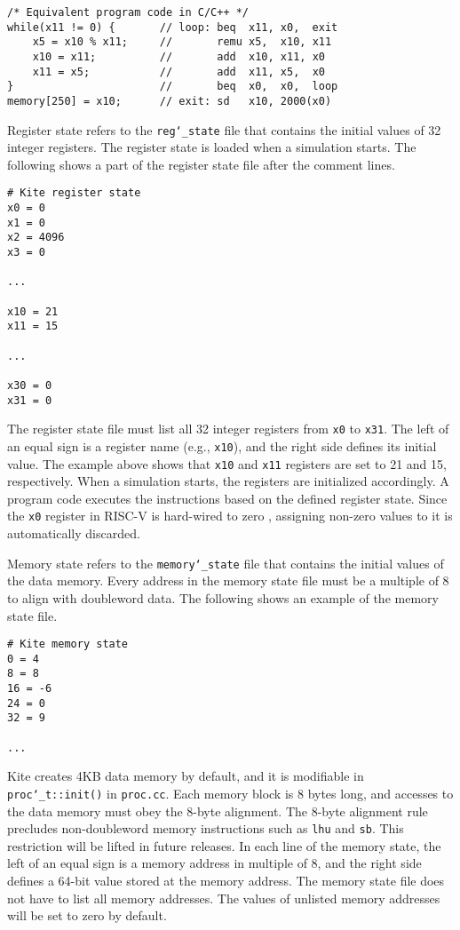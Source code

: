 \documentclass[10pt]{article}
\begin{document}
\begin{Verbatim}[frame=single]
/* Equivalent program code in C/C++ */
while(x11 != 0) {       // loop: beq  x11, x0,  exit
    x5 = x10 % x11;     //       remu x5,  x10, x11
    x10 = x11;          //       add  x10, x11, x0
    x11 = x5;           //       add  x11, x5,  x0
}                       //       beq  x0,  x0,  loop
memory[250] = x10;      // exit: sd   x10, 2000(x0)
\end{Verbatim}

Register state refers to the {\tt reg\char`_state} file that contains the initial values of 32 integer registers.
The register state is loaded when a simulation starts.
The following shows a part of the register state file after the comment lines.

\begin{Verbatim}[frame=single]
# Kite register state
x0 = 0
x1 = 0
x2 = 4096
x3 = 0

...

x10 = 21
x11 = 15

...

x30 = 0
x31 = 0
\end{Verbatim}

The register state file must list all 32 integer registers from {\tt x0} to {\tt x31}.
The left of an equal sign is a register name (e.g., {\tt x10}), and the right side defines its initial value.
The example above shows that {\tt x10} and {\tt x11} registers are set to 21 and 15, respectively.
When a simulation starts, the registers are initialized accordingly.
A program code executes the instructions based on the defined register state.
Since the {\tt x0} register in RISC-V is hard-wired to zero \cite{patterson_morgan2017}, assigning non-zero values to it is automatically discarded.

Memory state refers to the {\tt memory\char`_state} file that contains the initial values of the data memory.
Every address in the memory state file must be a multiple of 8 to align with doubleword data.
The following shows an example of the memory state file.

\begin{Verbatim}[frame=single]
# Kite memory state
0 = 4 
8 = 8 
16 = -6
24 = 0 
32 = 9 

...

\end{Verbatim}

Kite creates 4KB data memory by default, and it is modifiable in {\tt proc\char`_t::init()} in {\tt proc.cc}.
Each memory block is 8 bytes long, and accesses to the data memory must obey the 8-byte alignment.
The 8-byte alignment rule precludes non-doubleword memory instructions such as {\tt lhu} and {\tt sb}.
This restriction will be lifted in future releases.
In each line of the memory state, the left of an equal sign is a memory address in multiple of 8, and the right side defines a 64-bit value stored at the memory address.
The memory state file does not have to list all memory addresses.
The values of unlisted memory addresses will be set to zero by default.
\end{document}
